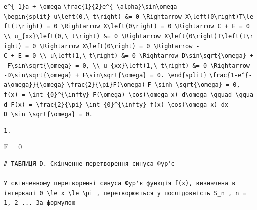 \documentclass[
  ukrainian,
]{article}
\begin{document}
\texttt{e\^{}\{-1\}a\ +\ \textbackslash{}omega}
\texttt{\textbackslash{}frac\{1\}\{2\}e\^{}\{-\textbackslash{}alpha\}\textbackslash{}sin\textbackslash{}omega}
\texttt{\textbackslash{}begin\{split\}\ u\textbackslash{}left(0,\textbackslash{}\ t\textbackslash{}right)\ \&=\ 0\ \textbackslash{}Rightarrow\ X\textbackslash{}left(0\textbackslash{}right)T\textbackslash{}left(t\textbackslash{}right)\ =\ 0\ \textbackslash{}Rightarrow\ X\textbackslash{}left(0\textbackslash{}right)\ =\ 0\ \textbackslash{}Rightarrow\ C\ +\ E\ =\ 0\ \textbackslash{}\textbackslash{}\ u\_\{xx\}\textbackslash{}left(0,\textbackslash{}\ t\textbackslash{}right)\ \&=\ 0\ \textbackslash{}Rightarrow\ X\textquotesingle{}\textquotesingle{}\textbackslash{}left(0\textbackslash{}right)T\textbackslash{}left(t\textbackslash{}right)\ =\ 0\ \textbackslash{}Rightarrow\ X\textquotesingle{}\textquotesingle{}\textbackslash{}left(0\textbackslash{}right)\ =\ 0\ \textbackslash{}Rightarrow\ -C\ +\ E\ =\ 0\ \textbackslash{}\textbackslash{}\ u\textbackslash{}left(1,\textbackslash{}\ t\textbackslash{}right)\ \&=\ 0\ \textbackslash{}Rightarrow\ D\textbackslash{}sin\textbackslash{}sqrt\{\textbackslash{}omega\}\ +\ F\textbackslash{}sin\textbackslash{}sqrt\{\textbackslash{}omega\}\ =\ 0,\ \textbackslash{}\textbackslash{}\ u\_\{xx\}\textbackslash{}left(1,\textbackslash{}\ t\textbackslash{}right)\ \&=\ 0\ \textbackslash{}Rightarrow\ -D\textbackslash{}sin\textbackslash{}sqrt\{\textbackslash{}omega\}\ +\ F\textbackslash{}sin\textbackslash{}sqrt\{\textbackslash{}omega\}\ =\ 0.\ \textbackslash{}end\{split\}}
\texttt{\textbackslash{}frac\{1-e\^{}\{-a\textbackslash{}omega\}\}\{\textbackslash{}omega\}}
\texttt{\textbackslash{}frac\{2\}\{\textbackslash{}pi\}F\textquotesingle{}\textquotesingle{}(\textbackslash{}omega)}
\texttt{F\ \textbackslash{}sinh\ \textbackslash{}sqrt\{\textbackslash{}omega\}\ =\ 0,}
\texttt{f(x)\ =\ \textbackslash{}int\_\{0\}\^{}\{\textbackslash{}infty\}\ F(\textbackslash{}omega)\ \textbackslash{}cos(\textbackslash{}omega\ x)\ d\textbackslash{}omega\ \textbackslash{}qquad\ \textbackslash{}qquad\ F(x)\ =\ \textbackslash{}frac\{2\}\{\textbackslash{}pi\}\ \textbackslash{}int\_\{0\}\^{}\{\textbackslash{}infty\}\ f(x)\ \textbackslash{}cos(\textbackslash{}omega\ x)\ dx}
\texttt{D\ \textbackslash{}sin\ \textbackslash{}sqrt\{\textbackslash{}omega\}\ =\ 0.}

\begin{verbatim}
1.
\end{verbatim}

F = 0

\begin{verbatim}
# ТАБЛИЦЯ D. Скінченне перетворення синуса Фур'є

У скінченному перетворенні синуса Фур'є функція f(x), визначена в інтервалі 0 \le x \le \pi , перетворюється у послідовність S_n , n = 1, 2 ... За формулою
\end{verbatim}
\end{document}
